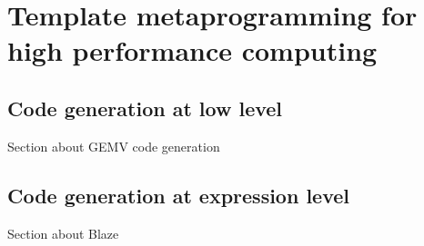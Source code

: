 \documentclass[../../main.tex]{subfiles}
\begin{document}
\chapter{Template metaprogramming for high performance computing}

\section{Code generation at low level}

Section about GEMV code generation

\section{Code generation at expression level}

Section about Blaze
\end{document}

